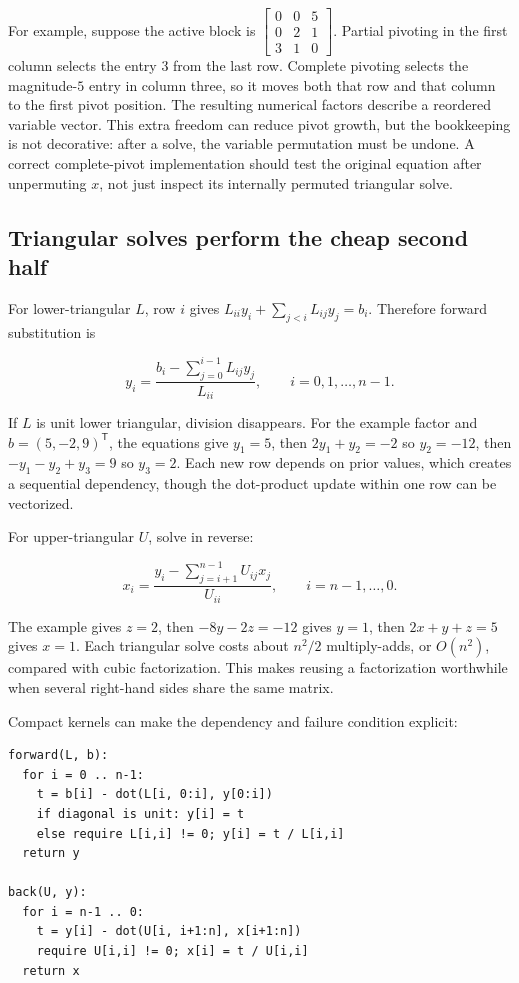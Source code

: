 For example, suppose the active block is \(\begin{bmatrix}0&0&5\\0&2&1\\3&1&0\end{bmatrix}\). Partial pivoting in the first column selects the entry \(3\) from the last row. Complete pivoting selects the magnitude-\(5\) entry in column three, so it moves both that row and that column to the first pivot position. The resulting numerical factors describe a reordered variable vector. This extra freedom can reduce pivot growth, but the bookkeeping is not decorative: after a solve, the variable permutation must be undone. A correct complete-pivot implementation should test the original equation after unpermuting \(x\), not just inspect its internally permuted triangular solve.

\subsection{Triangular solves perform the cheap second half}\label{triangular-solves-perform-the-cheap-second-half}

For lower-triangular \(L\), row \(i\) gives \(L_{ii}y_i+\sum_{j<i}L_{ij}y_j=b_i\). Therefore forward substitution is

\[
y_i=\frac{b_i-\sum_{j=0}^{i-1}L_{ij}y_j}{L_{ii}},\qquad i=0,1,\ldots,n-1.
\]

If \(L\) is unit lower triangular, division disappears. For the example factor and \(b=(5,-2,9)^\mathsf T\), the equations give \(y_1=5\), then \(2y_1+y_2=-2\) so \(y_2=-12\), then \(-y_1-y_2+y_3=9\) so \(y_3=2\). Each new row depends on prior values, which creates a sequential dependency, though the dot-product update within one row can be vectorized.

For upper-triangular \(U\), solve in reverse:

\[
x_i=\frac{y_i-\sum_{j=i+1}^{n-1}U_{ij}x_j}{U_{ii}},\qquad i=n-1,\ldots,0.
\]

The example gives \(z=2\), then \(-8y-2z=-12\) gives \(y=1\), then \(2x+y+z=5\) gives \(x=1\). Each triangular solve costs about \(n^2/2\) multiply-adds, or \(O(n^2)\), compared with cubic factorization. This makes reusing a factorization worthwhile when several right-hand sides share the same matrix.

Compact kernels can make the dependency and failure condition explicit:

\begin{verbatim}
forward(L, b):
  for i = 0 .. n-1:
    t = b[i] - dot(L[i, 0:i], y[0:i])
    if diagonal is unit: y[i] = t
    else require L[i,i] != 0; y[i] = t / L[i,i]
  return y

back(U, y):
  for i = n-1 .. 0:
    t = y[i] - dot(U[i, i+1:n], x[i+1:n])
    require U[i,i] != 0; x[i] = t / U[i,i]
  return x
\end{verbatim}

